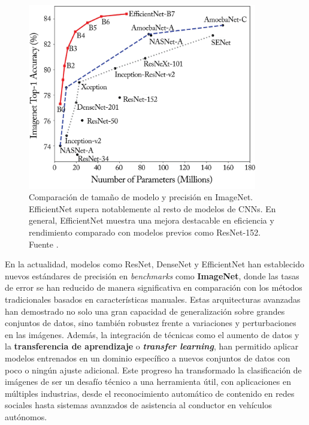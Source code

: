 \begin{figure}[hbt!]
	\centering
	\includegraphics[width=100mm]{img/cnn-sota.png}
	\caption{Comparación de tamaño de modelo y precisión en ImageNet. EfficientNet supera notablemente al resto de modelos de CNNs. En general, EfficientNet muestra una mejora destacable en eficiencia y rendimiento comparado con modelos previos como ResNet-152. Fuente \cite{tan2019efficientnet}.}
\end{figure}

En la actualidad, modelos como ResNet, DenseNet y EfficientNet han establecido nuevos estándares de precisión en \textit{benchmarks} como \textbf{ImageNet}, donde las tasas de error se han reducido de manera significativa en comparación con los métodos tradicionales basados en características manuales. Estas arquitecturas avanzadas han demostrado no solo una gran capacidad de generalización sobre grandes conjuntos de datos, sino también robustez frente a variaciones y perturbaciones en las imágenes. Además, la integración de técnicas como el aumento de datos y la \textbf{transferencia de aprendizaje} o \textbf{\textit{transfer learning}}, han permitido aplicar modelos entrenados en un dominio específico a nuevos conjuntos de datos con poco o ningún ajuste adicional. Este progreso ha transformado la clasificación de imágenes de ser un desafío técnico a una herramienta útil, con aplicaciones en múltiples industrias, desde el reconocimiento automático de contenido en redes sociales hasta sistemas avanzados de asistencia al conductor en vehículos autónomos.

\endinput
